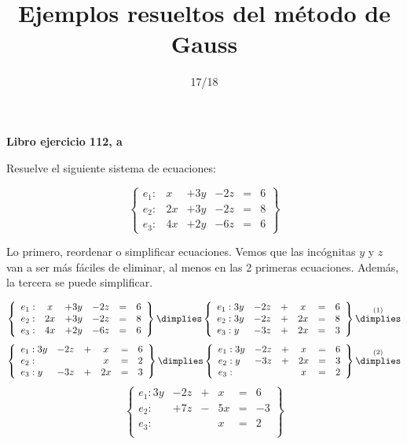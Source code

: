 \documentclass[palatino,nosec]{Docencia}
\title{Ejemplos resueltos del método de Gauss}
\author{}
\date{17/18}
\begin{document}
\pagestyle{plain}
\maketitle

\newpage
\begin{problem}
\textbf{Libro ejercicio 112, a}

Resuelve el siguiente sistema de ecuaciones:

\[
\left\{\begin{array}{lccccc}
e_1: &x&+3y&-2z&=&6\\
e_2: &2x&+3y&-2z&=&8\\
e_3: &4x&+2y&-6z&=&6
\end{array}\right\}
\]

\solution

Lo primero, reordenar o simplificar ecuaciones. Vemos que las incógnitas $y$ y $z$ van a ser más fáciles de eliminar, al menos en las 2 primeras ecuaciones. Además, la tercera se puede simplificar.


\[
\left\{\begin{array}{lccccc}
e_1: &x&+3y&-2z&=&6\\
e_2: &2x&+3y&-2z&=&8\\
e_3: &4x&+2y&-6z&=&6
\end{array}\right\}
\dimplies
\left\{\begin{array}{lccccc}
e_1: 3y&-2z&+&x&=&6\\
e_2: 3y&-2z&+&2x&=&8\\
e_3: y&-3z&+&2x&=&3
\end{array}\right\}
\overset{(1)}{\dimplies}
\]
\[
\left\{\begin{array}{lccccc}
e_1: 3y&-2z&+&x&=&6\\
e_2: &&&x&=&2\\
e_3: y&-3z&+&2x&=&3
\end{array}\right\}
\dimplies
\left\{\begin{array}{lccccc}
e_1: 3y&-2z&+&x&=&6\\
e_2: y&-3z&+&2x&=&3\\
e_3: &&&x&=&2
\end{array}\right\}
\overset{(2)}{\dimplies}\]
\[
\left\{\begin{array}{lccccc}
e_1: 3y&-2z&+&x&=&6\\
e_2: &+7z&-&5x&=&-3\\
e_3: &&&x&=&2\\
\end{array}\right\}
\]



\end{problem}
\end{document}
